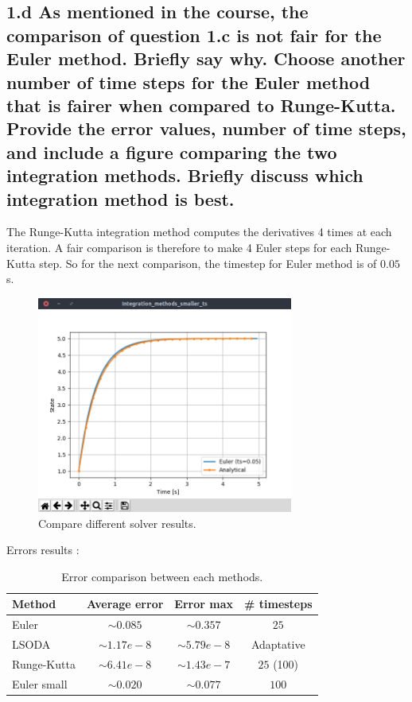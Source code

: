 \documentclass{cmc}
\begin{document}
\subsection*{1.d As mentioned in the course, the comparison of question 1.c is
  not fair for the Euler method.  Briefly say why. Choose another number of time
  steps for the Euler method that is fairer when compared to
  Runge-Kutta. Provide the error values, number of time steps, and include a
  figure comparing the two integration methods. Briefly discuss which
  integration method is best.}

The Runge-Kutta integration method computes the derivatives 4 times at each iteration. A fair comparison is therefore to make 4 Euler steps for each Runge-Kutta step. So for the next comparison, the timestep for Euler method is of $0.05$ s.

\begin{figure}[H]
  \centering
  \includegraphics[width=0.75\textwidth,trim={0 1.25cm 0 0},clip]{figures/ex1_euler_small_ts.png}
  \caption{Compare different solver results.}
  \label{fig:ex1_tests_solver}
\end{figure}

Errors results :

\begin{table}[H]
\centering
\caption{Error comparison between each methods.}
	\begin{tabular}{lccc}
		\hline
		\textbf{Method} & \textbf{Average error} & \textbf{Error max} & \textbf{\# timesteps} \\ \hline \hline
		Euler & $\sim 0.085$ & $\sim 0.357$ & $25$ \\
		LSODA & $\sim 1.17 e-8$ & $\sim 5.79 e-8$ & Adaptative \\
		Runge-Kutta & $\sim 6.41 e-8$ & $\sim 1.43e-7$ & $25$ (100) \\
		Euler small & $\sim 0.020$ & $\sim 0.077$ & $100$ \\ \hline
	\end{tabular}
\end{table}
\end{document}
